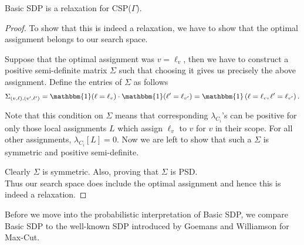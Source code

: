 \begin{theorem}\label{sdprelaxproof}
Basic SDP is a relaxation for CSP($\Gamma$).
\end{theorem}
\begin{proof}
To show that this is indeed a relaxation, we have to show that the optimal assignment belongs to our search space. 

Suppose that the optimal assignment was $v=\ell_v$, then we have to construct a positive semi-definite matrix $\Sigma$ such that choosing it gives us precisely the above assignment. 
Define the entries of $\Sigma$ as follows 
$$ \Sigma_{\lrb{v, \ell},\lrb{v', \ell'}} = \mathbbm{1}(\ell = \ell_v) \cdot \mathbbm{1}(\ell' = \ell_{v'}) = \mathbbm{1}\lrb{\ell = \ell_v, \ell'= \ell_{v'}}.$$ 

Note that this condition on $\Sigma$ means that corresponding $\lambda_{C_i}$'s can be positive for only those local assignments $L$ which assign $\ell_v$ to $v$ for $v$ in their scope. 
For all other assignments, $\lambda_{C_i}[L]=0$.
Now we are left to show that such a $\Sigma$ is symmetric and positive semi-definite.

Clearly $\Sigma$ is symmetric. 
Also, 
proving that $\Sigma$ is PSD. \\
Thus our search space does include the optimal assignment and hence this is indeed a relaxation.
\end{proof}

Before we move into the probabilistic interpretation of Basic SDP, we compare Basic SDP to the well-known SDP introduced by Goemans and Williamson for Max-Cut.

